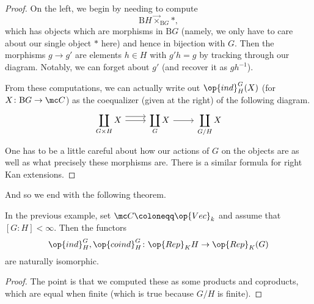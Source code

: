 \begin{proof}
	On the left, we begin by needing to compute
	\[\mathrm BH\vec\times_{\mathrm BG}*,\]
	which has objects which are morphisms in $\mathrm BG$ (namely, we only have to care about our single object $*$ here) and hence in bijection with $G$. Then the morphisms $g\to g'$ are elements $h\in H$ with $g'h=g$ by tracking through our diagram. Notably, we can forget about $g'$ (and recover it as $gh^{-1}$).

	From these computations, we can actually write out $\op{ind}^G_H(X)$ (for $X\colon\mathrm BG\to\mc C$) as the coequalizer (given at the right) of the following diagram.
	\[\begin{tikzcd}
		{\displaystyle\coprod_{G\times H}X} & {\displaystyle\coprod_{G}X} & {\displaystyle\coprod_{G/H}X}
		\arrow[from=1-1, to=1-2]
		\arrow[from=1-2, to=1-3]
		\arrow[shift left=2, from=1-1, to=1-2]
	\end{tikzcd}\]
	One has to be a little careful about how our actions of $G$ on the objects are as well as what precisely these morphisms are. There is a similar formula for right Kan extensions.
\end{proof}
And so we end with the following theorem.
\begin{theorem}
	In the previous example, set $\mc C\coloneqq\op{Vec}_k$ and assume that $[G:H]<\infty$. Then the functors
	\[\op{ind}^G_H,\op{coind}^G_H\colon\op{Rep}_KH\to\op{Rep}_K(G)\]
	are naturally isomorphic.
\end{theorem}
\begin{proof}
	The point is that we computed these as some products and coproducts, which are equal when finite (which is true because $G/H$ is finite).
\end{proof}